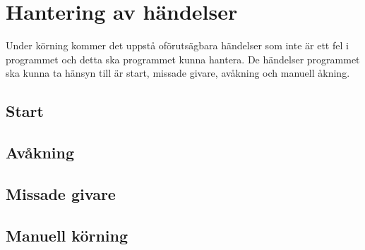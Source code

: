 \section{Hantering av händelser}
Under körning kommer det uppstå oförutsägbara händelser som inte är ett fel i programmet och detta ska programmet kunna hantera. De händelser programmet ska kunna ta hänsyn till är start, missade givare, avåkning och manuell åkning.

\subsection{Start} 

\subsection{Avåkning} 

\subsection{Missade givare} 

\subsection{Manuell körning} 

